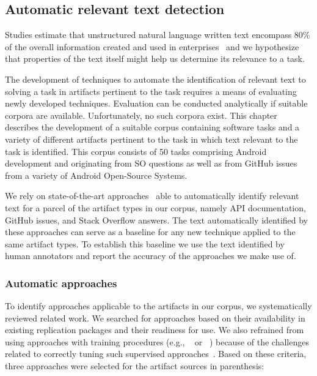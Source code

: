 
\subsection{Automatic relevant text detection}
\label{cp4:relevant-text-auto}

Studies estimate that unstructured natural language written text encompass 80\% 
of the overall information created and used in enterprises~\cite{Bavota2016} 
and we hypothesize that properties of the text itself might help us determine its relevance to a task.





The development of techniques
to automate the identification of relevant text
to solving a task in artifacts
pertinent to the task requires a
means of evaluating newly developed
techniques. Evaluation can be conducted
analytically if suitable corpora are
available. Unfortunately, no such corpora
exist. This chapter describes the
development of a suitable corpus
containing
software tasks
and a variety of different artifacts pertinent
to the task in which text relevant to the
task is identified.
This corpus consists of 
50 tasks comprising Android development and originating from \acf{SO} questions
as well as from GitHub issues from a variety of Android Open-Source Systems.




We rely on state-of-the-art approaches~\cite{nadi2020, Robillard2015, Lotufo2012, Xu2017} able to automatically identify relevant text for a parcel of the  artifact types in our corpus, namely API documentation, GitHub issues, and Stack Overflow answers.
The text automatically identified by these approaches can serve as a baseline for 
any new technique applied to the same artifact types. 
To establish this baseline we use the text identified by human annotators and report the accuracy of the approaches we make use of.


\subsubsection{Automatic approaches}


To identify approaches applicable to the artifacts in our corpus, we systematically reviewed related work. We searched for approaches based on their availability in existing replication packages and their readiness for use.
We also refrained from using approaches with training procedures (e.g., ~\cite{liu2020} or ~\cite{Treude2016}) because of the challenges related to correctly tuning such supervised approaches~\cite{Chaparro2017, fucci2019}. Based on these criteria, three approaches were selected for the artifact sources in parenthesis:


